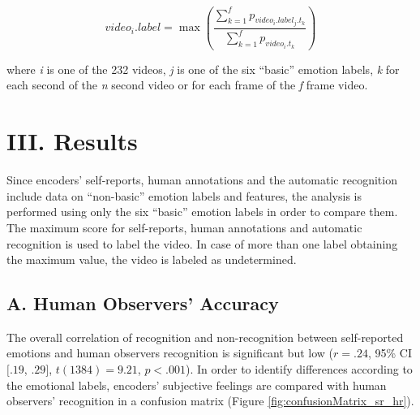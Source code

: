 \documentclass[conference,final,]{IEEEtran}
\begin{document}
\begin{equation}
\label{eq:3}
video_{i}.label = \max\left(\frac{\sum_{k=1}^{f}p_{video_{i}.label_{j}.t_{k}}}{\sum_{k=1}^{f}p_{video_{i}.t_{k}}}\right)
\end{equation}

where \emph{i} is one of the 232 videos, \emph{j} is one of the six
``basic'' emotion labels, \emph{k} for each second of the \emph{n}
second video or for each frame of the \emph{f} frame video.

\hypertarget{iii.-results}{%
\section{III. Results}\label{iii.-results}}

Since encoders' self-reports, human annotations and the automatic
recognition include data on ``non-basic'' emotion labels and features,
the analysis is performed using only the six ``basic'' emotion labels in
order to compare them. The maximum score for self-reports, human
annotations and automatic recognition is used to label the video. In
case of more than one label obtaining the maximum value, the video is
labeled as undetermined.

\hypertarget{a.-human-observers-accuracy}{%
\subsection{A. Human Observers'
Accuracy}\label{a.-human-observers-accuracy}}

The overall correlation of recognition and non-recognition between
self-reported emotions and human observers recognition is significant
but low (\(r = .24\), 95\% CI \([.19\), \(.29]\), \(t(1384) = 9.21\),
\(p < .001\)). In order to identify differences according to the
emotional labels, encoders' subjective feelings are compared with human
observers' recognition in a confusion matrix (Figure
\ref{fig:confusionMatrix_sr_hr}).
\end{document}
